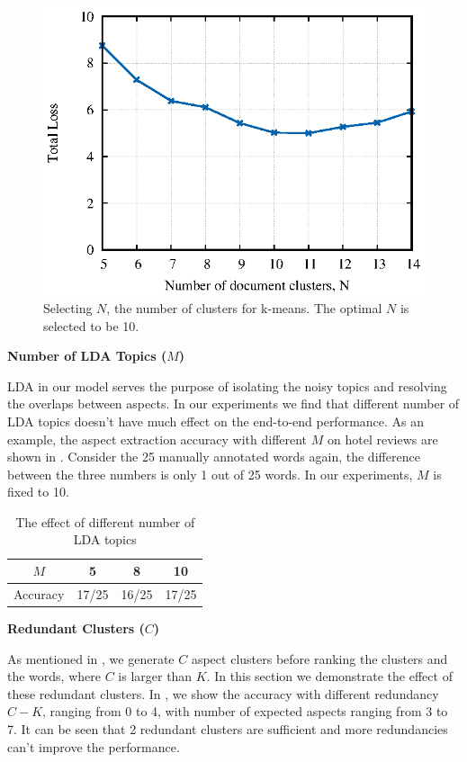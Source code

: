 \begin{figure}[th!]
\centering
\includegraphics[width=0.8\columnwidth]{data/differentn}
\caption{Selecting $N$, the number of clusters for k-means. The optimal
$N$ is selected to be 10.}
\label{fig:differentn}
\end{figure}

\textbf{Number of LDA Topics ($M$)}

LDA in our model serves the purpose of isolating the 
noisy topics and resolving the overlaps between aspects.
In our experiments we find that different number of LDA topics
doesn't have much effect on the end-to-end performance.
As an example, the aspect extraction accuracy with different $M$
on hotel reviews are shown in .
Consider the 25 manually annotated words again,
the difference between the three numbers is only 
1 out of 25 words.
In our experiments, $M$ is fixed to 10.
\begin{table}[th]
	\centering
	\caption{The effect of different number of LDA topics}
	\label{table:differentm}
	\begin{tabular}{|c|c|c|c|}
		\hline
		$M$ & 5 & 8 & 10 \\\hline
		Accuracy & 17/25 & 16/25 & 17/25 \\\hline
	\end{tabular}
\end{table}

\textbf{Redundant Clusters ($C$)}

As mentioned in , 
we generate $C$ aspect clusters before ranking the clusters and the words, where $C$ is larger than $K$.
In this section we demonstrate the effect of these redundant clusters.
In , we show the accuracy with different 
redundancy $C-K$, 
ranging from 0 to 4, with number of expected aspects ranging from 3 to 7.
It can be seen that 2 redundant clusters are sufficient and 
more redundancies can't improve the performance.

